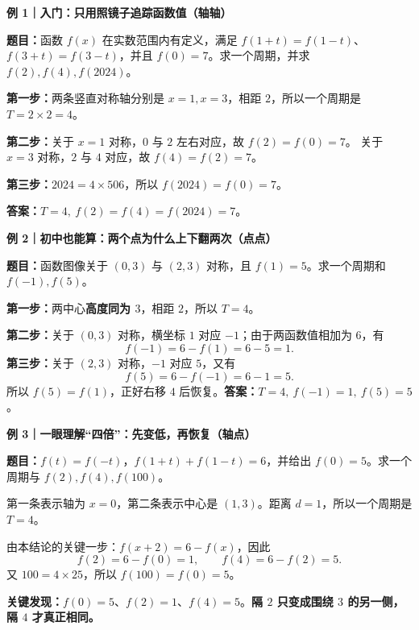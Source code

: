 \clearpage
\begin{examplebox}
\textbf{\textcolor{CExample}{例 1｜入门：只用照镜子追踪函数值（轴轴）}}



\textbf{题目：}函数 $f(x)$ 在实数范围内有定义，满足
$f(1+t)=f(1-t)$、$f(3+t)=f(3-t)$，并且 $f(0)=7$。求一个周期，并求 $f(2),f(4),f(2024)$。

\textbf{第一步：}两条竖直对称轴分别是 $x=1,x=3$，相距 $2$，所以一个周期是 $T=2\times2=4$。

\textbf{第二步：}关于 $x=1$ 对称，$0$ 与 $2$ 左右对应，故 $f(2)=f(0)=7$。
关于 $x=3$ 对称，$2$ 与 $4$ 对应，故 $f(4)=f(2)=7$。

\textbf{第三步：}$2024=4\times506$，所以 $f(2024)=f(0)=7$。

\textbf{答案：}$\boxed{T=4,\ f(2)=f(4)=f(2024)=7}$。

\medskip

\end{examplebox}
\clearpage
\begin{examplebox}
\textbf{\textcolor{CExample}{例 2｜初中也能算：两个点为什么上下翻两次（点点）}}



\textbf{题目：}函数图像关于 $(0,3)$ 与 $(2,3)$ 对称，且 $f(1)=5$。求一个周期和 $f(-1),f(5)$。

\textbf{第一步：}两中心\textbf{高度同为 $3$}，相距 $2$，所以 $T=4$。

\textbf{第二步：}关于 $(0,3)$ 对称，横坐标 $1$ 对应 $-1$；由于两函数值相加为 $6$，有
\[
 f(-1)=6-f(1)=6-5=1.
\]
\textbf{第三步：}关于 $(2,3)$ 对称，$-1$ 对应 $5$，又有
\[
 f(5)=6-f(-1)=6-1=5.
\]
所以 $f(5)=f(1)$，正好右移 $4$ 后恢复。\textbf{答案：}$T=4,\ f(-1)=1,\ f(5)=5$。

\medskip

\end{examplebox}
\clearpage
\begin{examplebox}
\textbf{\textcolor{CExample}{例 3｜一眼理解“四倍”：先变低，再恢复（轴点）}}



\textbf{题目：}$f(t)=f(-t)$，$f(1+t)+f(1-t)=6$，并给出 $f(0)=5$。求一个周期与 $f(2),f(4),f(100)$。

第一条表示轴为 $x=0$，第二条表示中心是 $(1,3)$。距离 $d=1$，所以一个周期是 $T=4$。

由本结论的关键一步：$f(x+2)=6-f(x)$，因此
\[
 f(2)=6-f(0)=1,\qquad f(4)=6-f(2)=5.
\]
又 $100=4\times25$，所以 $f(100)=f(0)=5$。

\textbf{关键发现：}$f(0)=5$、$f(2)=1$、$f(4)=5$。\textbf{隔 $2$ 只变成围绕 $3$ 的另一侧，隔 $4$ 才真正相同。}

\medskip

\end{examplebox}
